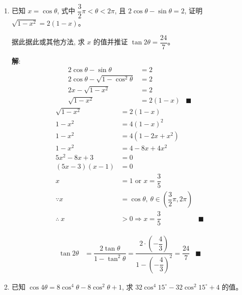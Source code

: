 \documentclass{report}
\newcommand{\sol}{\vspace{0.2cm}\textbf{解}:}
\begin{document}
\begin{enumerate}[leftmargin=*]
        \item 已知 $x=\cos \theta$, 式中 $\dfrac{3}{2} \pi<\theta<2 \pi$, 且 $2 \cos \theta-\sin \theta=2$, 证明 $\sqrt{1-x^2}=2(1-x)$。
        
        据此据此或其他方法, 求 $x$ 的值并推证 $\tan 2 \theta=\dfrac{24}{7}$。

        \sol{}
        \begin{align*}
            2\cos\theta - \sin\theta &= 2\\
            2\cos\theta - \sqrt{1-\cos^2\theta} &= 2\\
            2x - \sqrt{1-x^2} &= 2\\
            \sqrt{1-x^2} &= 2(1-x) & \blacksquare
        \end{align*}
        \begin{align*}
            \sqrt{1-x^2} &= 2(1-x) \\
            1-x^2 &= 4(1-x)^2\\
            1-x^2 &= 4(1-2x+x^2)\\
            1 - x^2 &= 4 - 8x + 4x^2\\
            5x^2 - 8x + 3 &= 0\\
            (5x - 3)(x - 1) &= 0\\
            x &= 1 \text{ or } x = \dfrac{3}{5}\\
            \because x &= \cos\theta,\ \theta \in \left(\dfrac{3}{2}\pi, 2\pi\right)\\
            \therefore\ x &> 0 \Rightarrow x = \dfrac{3}{5} & \blacksquare
        \end{align*}
        \begin{center}
        \end{center}
        \begin{align*}
            \tan 2\theta &= \dfrac{2\tan\theta}{1-\tan^2\theta} = \dfrac{2\cdot\left(-\dfrac{4}{3}\right)}{1-\left(-\dfrac{4}{3}\right)^2} = \dfrac{24}{7} & \blacksquare
        \end{align*}

        \item 已知 $\cos 4 \theta=8 \cos ^4 \theta-8 \cos ^2 \theta+1$, 求 $32 \cos ^4 15^{\circ}-32 \cos ^2 15^{\circ}+4$ 的值。
        

\end{enumerate}
\end{document}
